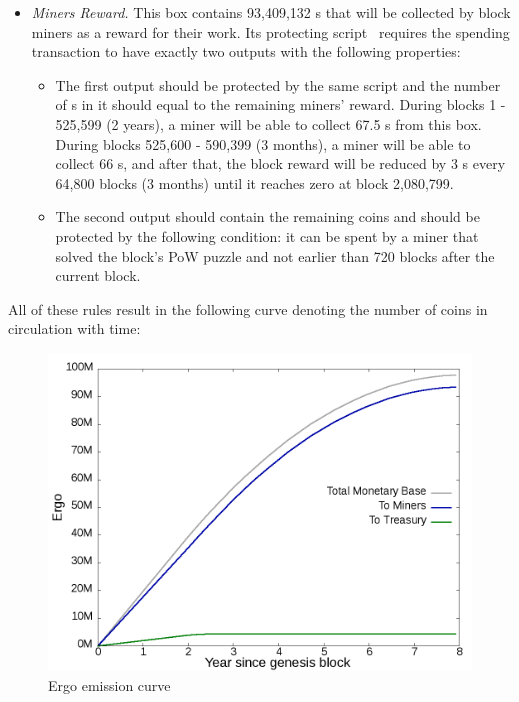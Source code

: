 \begin{itemize}
    \item{\em Miners Reward.} This box contains 93,409,132 \Erg{}s that will be collected by block miners
    as a reward for their work.
    Its protecting script~\cite{scriptEmission} requires the spending transaction to have exactly two outputs with the following properties:

    \begin{itemize}
    \item{} The first output should be protected by the same script and the number of \Erg{}s in it should
    equal to the remaining miners' reward.
    During blocks 1 - 525,599 (2 years), a miner will be able to collect 67.5 \Erg{}s from this box. During blocks 525,600 - 590,399 (3 months), a miner will be able to collect 66 \Erg{}s, and after that, the block reward will be reduced by 3 \Erg{}s every 64,800 blocks (3 months) until it reaches zero at block 2,080,799.

    \item{} The second output should contain the remaining coins and should be protected by the following condition:
    it can be spent by a miner that solved the block's PoW puzzle and not earlier than 720 blocks after the current block.
    \end{itemize}

\end{itemize}

All of these rules result in the following curve denoting the number of coins in circulation with time:

\begin{figure}[H]
    \centering
    \includegraphics[width=\textwidth]{img/emission.png}
    \caption{Ergo emission curve
    \label{fig:emission} }
\end{figure}
